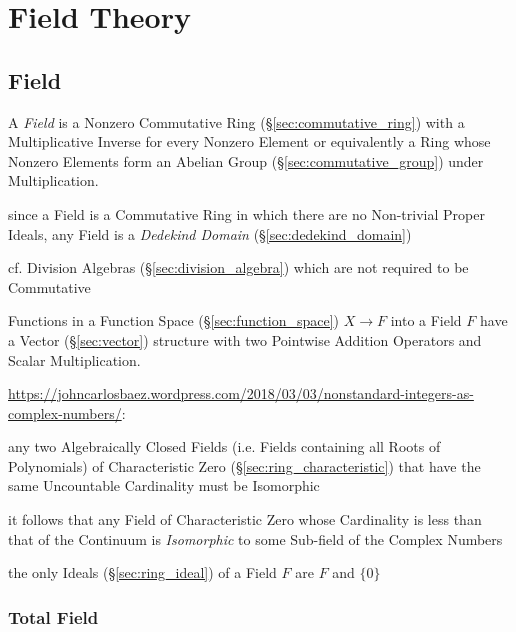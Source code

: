 \section{Field Theory}\label{sec:field_theory}

\subsection{Field}\label{sec:field}

A \emph{Field} is a Nonzero Commutative Ring
(\S\ref{sec:commutative_ring}) with a Multiplicative Inverse for every
Nonzero Element or equivalently a Ring whose Nonzero Elements form an
Abelian Group (\S\ref{sec:commutative_group}) under Multiplication.

since a Field is a Commutative Ring in which there are no Non-trivial Proper
Ideals, any Field is a \emph{Dedekind Domain} (\S\ref{sec:dedekind_domain})

cf. Division Algebras (\S\ref{sec:division_algebra}) which are not required to
be Commutative

Functions in a Function Space (\S\ref{sec:function_space}) $X
\rightarrow F$ into a Field $F$ have a Vector (\S\ref{sec:vector})
structure with two Pointwise Addition Operators and Scalar
Multiplication.

\url{https://johncarlosbaez.wordpress.com/2018/03/03/nonstandard-integers-as-complex-numbers/}:

any two Algebraically Closed Fields (i.e. Fields containing all Roots of
Polynomials) of Characteristic Zero (\S\ref{sec:ring_characteristic}) that have
the same Uncountable Cardinality must be Isomorphic

it follows that any Field of Characteristic Zero whose Cardinality is less than
that of the Continuum is \emph{Isomorphic} to some Sub-field of the Complex
Numbers

the only Ideals (\S\ref{sec:ring_ideal}) of a Field $F$ are $F$ and $\{0\}$



\subsubsection{Total Field}\label{sec:total_field}

